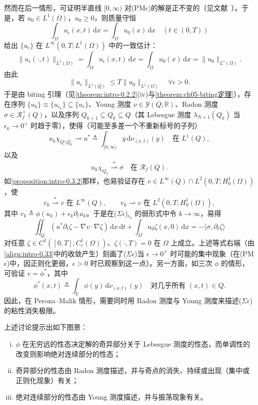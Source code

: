 \documentclass[../main.tex]{subfiles}
\begin{document}
然而在后一情形，可证明半直线 $[0,\infty)$ 对(PM$\epsilon$)的解是正不变的（见文献~\cite{ref96}）。于是，若 $u_0\in L^1(\Omega)$，$u_0\geqslant0$，则质量守恒
\[
\int_\Omega u_\epsilon(x,t)\,\mathrm{d}x = \int_\Omega u_0(x)\,\mathrm{d}x \quad (t\in(0,T))
\]
给出 $\{u_\epsilon\}$ 在 $L^\infty(0,T;L^1(\Omega))$ 中的一致估计：
\[
\|u_\epsilon(\cdot,t)\|_{L^1(\Omega)}
= \int_\Omega u_\epsilon(x,t)\,\mathrm{d}x
= \int_\Omega u_0(x)\,\mathrm{d}x
= \|u_0\|_{L^1(\Omega)}.
\]
由此
\[
\|u_\epsilon\|_{L^1(Q)} \leqslant T\|u_0\|_{L^1(\Omega)} \quad \forall\epsilon>0.
\]
于是由 biting 引理（见\cref{theorem:intro-0.2.2}(iv)与\cref{theorem:ch05-biting定理}），存在序列 $\{u_k\}\equiv\{u_{\epsilon_k}\}\subseteq\{u_\epsilon\}$、Young 测度 $\nu\in\mathcal{Y}(Q;\mathbb{R})$、Radon 测度 $\sigma\in\mathscr{R}^+_f(Q)$，以及序列 $Q_{k+1}\subseteq Q_k\subseteq Q$（其 Lebesgue 测度 $\lambda_{N+1}(Q_k)$ 当 $\epsilon_k\to0^+$ 时趋于零），使得（可能至多差一个不重新标号的子列）
\[
u_k\chi_{Q\setminus Q_k}\rightharpoonup u^* \triangleq  \int_{[0,\infty)}y\,\mathrm{d}\nu_{(x,t)}(y)
\quad \text{在 }L^1(Q),
\]
以及
\begin{align}
u_k\chi_{Q_k} \stackrel{*}{\rightharpoonup}\sigma \quad \text{在 }\mathscr{R}_f(Q). \label{align:intro-0.33}
\end{align}
如\cref{proposition:intro-0.3.2}那样，也易验证存在 $v\in L^\infty(Q)\cap L^2(0,T;H^1_0(\Omega))$，使
\[
v_k\stackrel{*}{\rightharpoonup}v \text{ 在 }L^\infty(Q),
\qquad
v_k\rightharpoonup v \text{ 在 }L^2(0,T;H^1_0(\Omega)),
\]
其中 $v_k\triangleq \phi(u_k)+\epsilon_k\partial_t u_k$。于是在($\Sigma\epsilon$)$_{\epsilon_k}$ 的弱形式中令 $k\to\infty$，易得
\[
\iint_Q(u^*\partial_t\zeta - \nabla v\cdot\nabla\zeta)\,\mathrm{d}x\,\mathrm{d}t
+ \int_\Omega u_0\zeta(x,0)\,\mathrm{d}x
= -\langle\sigma,\partial_t\zeta\rangle
\]
对任意 $\zeta\in C^1([0,T];C^1_c(\Omega))$、$\zeta(\cdot,T)=0$ 在 $\Omega$ 上成立。上述等式右端（由\eqref{align:intro-0.33}中的收敛产生）刻画了($\Sigma\epsilon$)当 $\epsilon\to0^+$ 时可能的集中现象（在(PM$\epsilon$)中，因正则化更弱，$\epsilon>0$ 时已观察到这一点）。另一方面，如三次 $\phi$ 的情形，可验证 $v=\phi^*$，其中
\[
\phi^*(x,t)\triangleq \int_{\mathbb{R}}\phi(y)\,\mathrm{d}\nu_{(x,t)}(y)
\quad \text{对几乎所有 }(x,t)\in Q.
\]
因此，在 Perona--Malik 情形，需要同时用 Radon 测度与 Young 测度来描述($\Sigma\epsilon$)的粘性消失极限。

上述讨论提示出如下图景：
\begin{enumerate}[(i)]
\item $\phi$ 在无穷远的性态决定解的奇异部分关于 Lebesgue 测度的性态，而单调性的改变则影响绝对连续部分的性态；
\item 奇异部分的性态由 Radon 测度描述，并与奇点的消失、持续或出现（集中或正则化现象）有关；
\item 绝对连续部分的性态由 Young 测度描述，并与振荡现象有关。
\end{enumerate}
\end{document}
